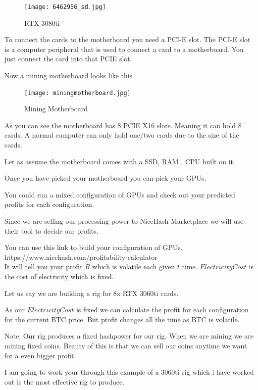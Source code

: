 \begin{figure}[H]
\centering
\texttt{[image: 6462956\_sd.jpg]}
\caption{RTX 3080ti}
\label{fig:rtx3080ti}
\end{figure}

To connect the cards to the motherboard you need a PCI-E slot. The PCI-E slot is a computer peripheral that is used to connect a card to a motherboard. You just connect the card into that PCIE slot.

Now a mining motherboard looks like this.

\begin{figure}[H]
\centering
\texttt{[image: miningmotherboard.jpg]}
\caption{Mining Motherboard}
\label{fig:motherboard}
\end{figure}

As you can see the motherboard has 8 PCIE X16 slots. Meaning it can hold 8 cards. A normal computer can only hold one/two cards due to the size of the cards.

Let as assume the motherboard comes with a SSD, RAM , CPU built on it.

Once you have picked your motherboard you can pick your GPUs.

You could run a mixed configuration of GPUs and check out your predicted profits for each configuration.

Since we are selling our processing power to NiceHash Marketplace we will use their tool to decide our profits.

You can use this link to build your configuration of GPUs. \\

https://www.nicehash.com/profitability-calculator \\
 
It will tell you your profit $R$ which is volatile each given $t$ time. $ElectricityCost$ is the cost of electricity which is fixed.

Let us say we are building a rig for 8x RTX 3060ti cards.

As our $ElectricityCost$ is fixed we can calculate the profit for each configuration for the current BTC price. But profit changes all the time as BTC is volatile.

Note: Our rig produces a fixed hashpower for our rig. When we are mining we are mining fixed coins. Beauty of this is that we can sell our coins anytime we want for a even bigger profit.

I am going to work your through this example of a 3060ti rig which i have worked out is the most effective rig to produce.

